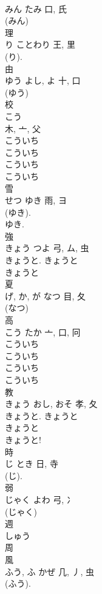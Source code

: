 \documentclass[8pt]{extreport}
\begin{document}
\begin{CJK}{UTF8}{min}
\\	みん	たみ	口, 氏	
\\	(みん) 
\\	理	
\\	り	ことわり	王, 里	
\\	(り).	
\\	由	
\\	ゆう	よし, よ	十, 口	
\\	(ゆう) 
\\	校	
\\	こう	
\\	木, 亠, 父	
\\	こういち
\\	こういち
\\	こういち
\\	こういち
\\	雪	
\\	せつ	ゆき	雨, ヨ	
\\	(ゆき).
\\	ゆき.
\\	強	
\\	きょう	つよ	弓, ム, 虫	
\\	きょうと. きょうと 
\\	きょうと 
\\	夏	
\\	げ, か, が	なつ	目, 夂		
\\	(なつ) 
\\	高	
\\	こう	たか	亠, 口, 冋	
\\	こういち
\\	こういち 
\\	こういち
\\	こういち
\\	教	
\\	きょう	おし, おそ	孝, 夂	
\\	きょうと. きょうと 
\\	きょうと 
\\	きょうと!	
\\	時	
\\	じ	とき	日, 寺	
\\	(じ). 
\\	弱	
\\	じゃく	よわ	弓, 冫	
\\	(じゃく) 
\\	週	
\\	しゅう	
\\	周		
\\	風	
\\	ふう, ふ	かぜ	几, 丿, 虫	
\\	(ふう). 

\end{CJK}
\end{document}
